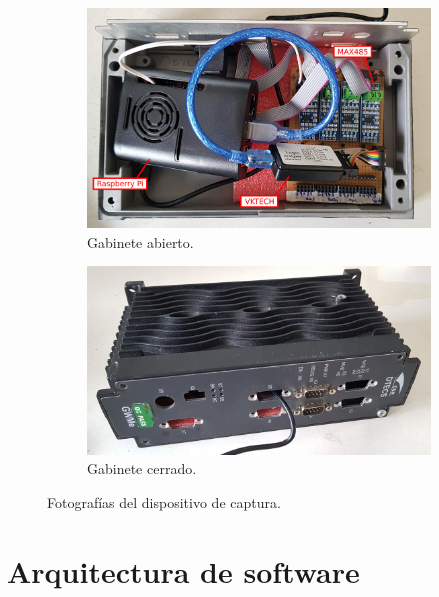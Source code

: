 \begin{figure}[htbp]
	\centering
    \begin{subfigure}[b]{1\textwidth}
        \centering
        \includegraphics[width=1\textwidth]{./Figures/foto-dispositivo.jpg}
        \caption{Gabinete abierto.}
    \end{subfigure}
    \begin{subfigure}[b]{1\textwidth}
        \centering
        \includegraphics[width=1\textwidth]{./Figures/disp-captura-cerrado.jpg}
        \caption{Gabinete cerrado.}
    \end{subfigure}
	\caption{Fotografías del dispositivo de captura.}
    \label{fig:fotodispositivo}
\end{figure}

\clearpage

\section{Arquitectura de software}
\label{sec:software}

